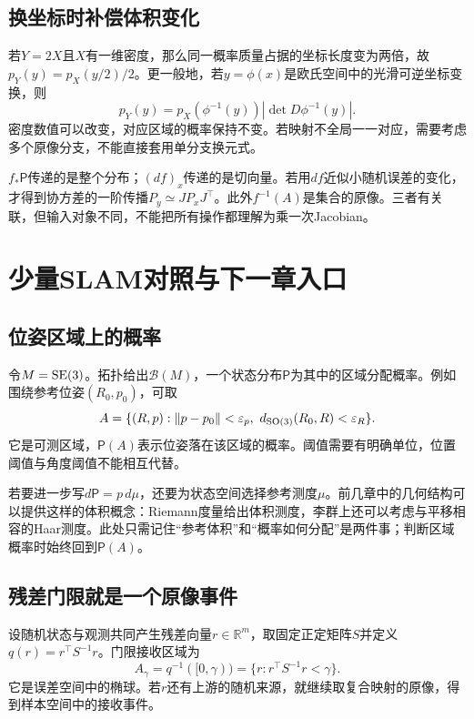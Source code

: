 \subsection{换坐标时补偿体积变化}

若$Y=2X$且$X$有一维密度，那么同一概率质量占据的坐标长度变为两倍，故$p_Y(y)=p_X(y/2)/2$。更一般地，若$y=\phi(x)$是欧氏空间中的光滑可逆坐标变换，则
\[
 p_Y(y)=p_X(\phi^{-1}(y))\left|\det D\phi^{-1}(y)\right|.
\]
密度数值可以改变，对应区域的概率保持不变。若映射不全局一一对应，需要考虑多个原像分支，不能直接套用单分支换元式。

\begin{remark}[几种同名的推前]
$f_*\mathsf P$传递的是整个分布；$(df)_x$传递的是切向量。若用$df$近似小随机误差的变化，才得到协方差的一阶传播$P_y\simeq JP_xJ^\top$。此外$f^{-1}(A)$是集合的原像。三者有关联，但输入对象不同，不能把所有操作都理解为乘一次Jacobian。
\end{remark}

\section{少量SLAM对照与下一章入口}

\subsection{位姿区域上的概率}

令$M=\operatorname{SE}(3)$。拓扑给出$\mathcal B(M)$，一个状态分布$\mathsf P$为其中的区域分配概率。例如围绕参考位姿$(R_0,p_0)$，可取
\[
 A=\{(R,p):\|p-p_0\|<\varepsilon_p,
                    \ d_{\operatorname{SO}(3)}(R_0,R)<\varepsilon_R\}.
\]
它是可测区域，$\mathsf P(A)$表示位姿落在该区域的概率。阈值需要有明确单位，位置阈值与角度阈值不能相互代替。

若要进一步写$d\mathsf P=p\,d\mu$，还要为状态空间选择参考测度$\mu$。前几章中的几何结构可以提供这样的体积概念：Riemann度量给出体积测度，李群上还可以考虑与平移相容的Haar测度。此处只需记住“参考体积”和“概率如何分配”是两件事；判断区域概率时始终回到$\mathsf P(A)$。

\subsection{残差门限就是一个原像事件}

设随机状态与观测共同产生残差向量$r\in\mathbb R^m$，取固定正定矩阵$S$并定义$q(r)=r^\top S^{-1}r$。门限接收区域为
\[
 A_\gamma=q^{-1}([0,\gamma))
          =\{r:r^\top S^{-1}r<\gamma\}.
\]
它是误差空间中的椭球。若$r$还有上游的随机来源，就继续取复合映射的原像，得到样本空间中的接收事件。

